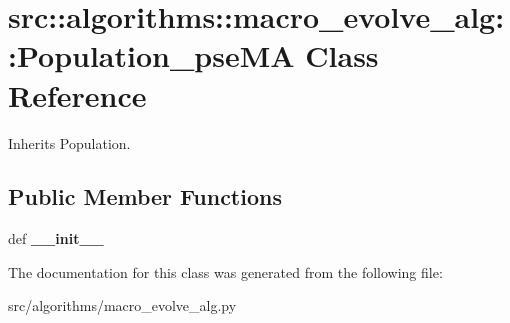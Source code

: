 \hypertarget{classsrc_1_1algorithms_1_1macro__evolve__alg_1_1Population__pseMA}{
\section{src::algorithms::macro\_\-evolve\_\-alg::Population\_\-pseMA Class Reference}
\label{classsrc_1_1algorithms_1_1macro__evolve__alg_1_1Population__pseMA}
}


Inherits Population.

\subsection*{Public Member Functions}
\begin{DoxyCompactItemize}
\item 
\hypertarget{classsrc_1_1algorithms_1_1macro__evolve__alg_1_1Population__pseMA_af1d30e0234790e1664a5589a37006646}{
def {\bfseries \_\-\_\-init\_\-\_\-}}
\label{classsrc_1_1algorithms_1_1macro__evolve__alg_1_1Population__pseMA_af1d30e0234790e1664a5589a37006646}

\end{DoxyCompactItemize}


The documentation for this class was generated from the following file:\begin{DoxyCompactItemize}
\item 
src/algorithms/macro\_\-evolve\_\-alg.py\end{DoxyCompactItemize}
